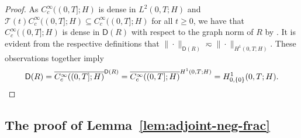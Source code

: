 \documentclass[reqno]{amsart}
\numberwithin{equation}{section}
\newcommand{\norm}[2]{     \| #1       \|_{ #2 }}
\newcommand{\clos}[1]{\overline{ #1 }}
\theoremstyle{remark}
\theoremstyle{definition}
\begin{document}
\begin{proof}
	As $C_{c}^\infty((0,T]; H)$ is dense in $L^2(0,T; H)$  
	and $\mathcal T(t)C_{c}^\infty((0,T]; H) \subseteq C_{c}^\infty((0,T]; H)$  
	for all $t \geq 0$, we have that $C_{c}^\infty((0,T]; H)$ is dense 
	in $\mathsf D(R)$ with respect to the graph norm of $R$ 
	by \cite[Proposition~II.1.7]{Engel1999}. 
	It is evident from the respective definitions that 
	$\norm{\cdot}{\mathsf D(R)} \eqsim \norm{\cdot}{H^1(0,T;H)}$.
	These observations together imply 
	\[ 
	\mathsf D(R) 
	= 
	\clos{C_c^\infty((0,T];H)}^{\mathsf D(R)} 
	= 
	\clos{C_c^\infty((0,T];H)}^{H^1(0,T;H)} 
	= 
	H^1_{0,\{0\}}(0,T; H). 
	\qedhere
	\] 
\end{proof}

\subsection{The proof of 
	\texorpdfstring{Lemma~\ref{lem:adjoint-neg-frac}}{Lemma 3.6}}
\label{app:subsec:proof-lemma-adjoint} 
\end{document}

